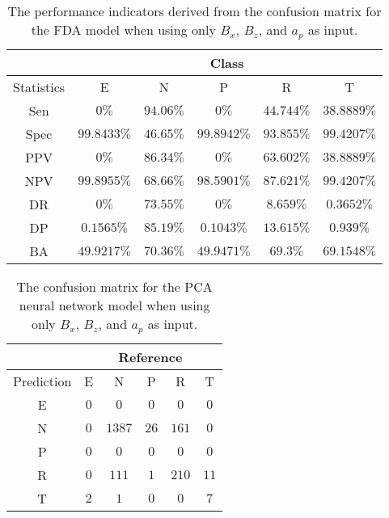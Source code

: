 \begin{table}[!ht]
	\centering
	\begin{tabular}{|c|c|c|c|c|c|}
		\hline
		 & \multicolumn{5}{c|}{Class} \\ \hline
		Statistics & E & N & P & R & T \\ \hline
		Sen & $0\%$ & $94.06\%$ & $0\%$ & $44.744\%$ & $38.8889\%$ \\ \hline
		Spec & $99.8433\%$ & $46.65\%$ & $99.8942\%$ & $93.855\%$ & $99.4207\%$ \\ \hline
		PPV & $0\%$ & $86.34\%$ & $0\%$ & $63.602\%$ & $38.8889\%$ \\ \hline
		NPV & $99.8955\%$ & $68.66\%$ & $98.5901\%$ & $87.621\%$ & $99.4207\%$ \\ \hline
		DR & $0\%$ & $73.55\%$ & $0\%$ & $8.659\%$ & $0.3652\%$ \\ \hline
		DP & $0.1565\%$ & $85.19\%$ & $0.1043\%$ & $13.615\%$ & $0.939\%$ \\ \hline
		BA & $49.9217\%$ & $70.36\%$ & $49.9471\%$ & $69.3\%$ & $69.1548\%$ \\ \hline
	\end{tabular}
	\caption{The performance indicators derived from the confusion matrix for the FDA model when using only $B_{x}$, $B_{z}$, and $a_{p}$ as input.}
	\label{tab:cs:reverse:xzap:fda}
\end{table}

\begin{table}[!ht]
	\centering
	\begin{tabular}{|c|c|c|c|c|c|}
		\hline
		 & \multicolumn{5}{|c|}{Reference} \\ \hline
		 Prediction & E & N & P & R & T \\ \hline
		 E & $0$ & $0$ & $0$ & $0$ & $0$ \\ \hline
		 N & $0$ & $1387$ & $26$ & $161$ & $0$ \\ \hline
		 P & $0$ & $0$ & $0$ & $0$ & $0$ \\ \hline
		 R & $0$ & $111$ & $1$ & $210$ & $11$ \\ \hline
		 T & $2$ & $1$ & $0$ & $0$ & $7$ \\ \hline
	\end{tabular}
	\caption{The confusion matrix for the PCA neural network model when using only $B_{x}$, $B_{z}$, and $a_{p}$ as input.}
	\label{tab:cm:xzap:pcaNNet}
\end{table}

